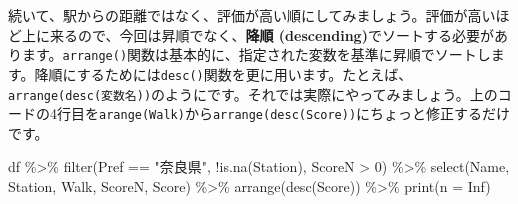\documentclass[
  a4paper,
  pandoc,
  ja=standard,
  jafont=haranoaji]{bxjsbook}
\newenvironment{Shaded}{\begin{snugshade}}{\end{snugshade}}
\newcommand{\AttributeTok}[1]{\textcolor[rgb]{0.00,0.48,0.65}{#1}}
\newcommand{\ConstantTok}[1]{\textcolor[rgb]{0.56,0.35,0.01}{#1}}
\newcommand{\DecValTok}[1]{\textcolor[rgb]{0.68,0.00,0.00}{#1}}
\newcommand{\FunctionTok}[1]{\textcolor[rgb]{0.28,0.35,0.67}{#1}}
\newcommand{\NormalTok}[1]{\textcolor[rgb]{0.00,0.48,0.65}{#1}}
\newcommand{\SpecialCharTok}[1]{\textcolor[rgb]{0.37,0.37,0.37}{#1}}
\newcommand{\StringTok}[1]{\textcolor[rgb]{0.13,0.47,0.30}{#1}}
\begin{document}
続いて、駅からの距離ではなく、評価が高い順にしてみましょう。評価が高いほど上に来るので、今回は昇順でなく、\textbf{降順
(descending)}でソートする必要があります。\texttt{arrange()}関数は基本的に、指定された変数を基準に昇順でソートします。降順にするためには\texttt{desc()}関数を更に用います。たとえば、\texttt{arrange(desc(変数名))}のようにです。それでは実際にやってみましょう。上のコードの4行目を\texttt{arange(Walk)}から\texttt{arrange(desc(Score))}にちょっと修正するだけです。

\begin{Shaded}
\begin{Highlighting}[numbers=left,,]
\NormalTok{df }\SpecialCharTok{\%\textgreater{}\%}
  \FunctionTok{filter}\NormalTok{(Pref }\SpecialCharTok{==} \StringTok{"奈良県"}\NormalTok{, }\SpecialCharTok{!}\FunctionTok{is.na}\NormalTok{(Station), ScoreN }\SpecialCharTok{\textgreater{}} \DecValTok{0}\NormalTok{) }\SpecialCharTok{\%\textgreater{}\%}
  \FunctionTok{select}\NormalTok{(Name, Station, Walk, ScoreN, Score) }\SpecialCharTok{\%\textgreater{}\%}
  \FunctionTok{arrange}\NormalTok{(}\FunctionTok{desc}\NormalTok{(Score)) }\SpecialCharTok{\%\textgreater{}\%}
  \FunctionTok{print}\NormalTok{(}\AttributeTok{n =} \ConstantTok{Inf}\NormalTok{)}
\end{Highlighting}
\end{Shaded}
\end{document}
